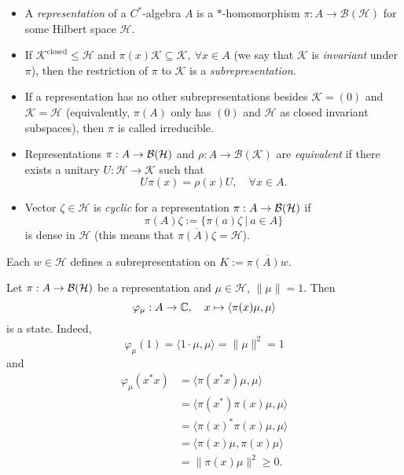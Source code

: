 \begin{definition}
  \begin{itemize}
    \item A \emph{representation} of a $C^*$-algebra $A$ is a $*$-homomorphism $\pi: A \to \mathcal{B}(\mathcal{H})$
  for some Hilbert space $\mathcal{H}$. 
    \item If $\mathcal{K}^{\mathrm{closed}} \leq \mathcal{H}$ and $\pi(x) \mathcal{K} \subseteq \mathcal{K},\ \forall x \in A$ (we say that $\mathcal{K}$ is \emph{invariant} under $\pi$),
  then the restriction of $\pi$ to $\mathcal{K}$ is a \emph{subrepresentation}.
    \item   If a representation has no other subrepresentations besides $\mathcal{K} = (0)$ and $\mathcal{K} = \mathcal{H}$
  (equivalently, $\pi(A)$ only has $(0)$ and $\mathcal{H}$ as closed invariant subspaces),
  then $\pi$ is called irreducible.
    \item Representations $\pi: A \to \operatorname{\mathcal{B} (\mathcal{H})}$ and $\rho: A \to \mathcal{B} (\mathcal{K})$
  are \emph{equivalent} if there exists a unitary $U: \mathcal{H} \to \mathcal{K}$ such that $$U \pi(x) = \rho(x) U,\quad \forall x \in A.$$
    \item Vector $\zeta \in \mathcal{H}$ is \emph{cyclic} for a representation $\pi: A \to \operatorname{\mathcal{B} (\mathcal{H})}$ if 
    $$\pi (A) \zeta := \{\pi(a) \zeta\ |\ a \in A\}$$
    is dense in $\mathcal{H}$ (this means that $\overline{\pi (A) \zeta} = \mathcal{H}$).
  \end{itemize}
   
\end{definition}

\begin{example}
  Each $w \in \mathcal{H}$ defines a subrepresentation on $K := \overline{\pi (A) w}$.
\end{example}

\begin{example}
  Let $\pi: A \to \operatorname{\mathcal{B} (\mathcal{H})}$ be a representation and $\mu \in \mathcal{H}$, $\| \mu \| = 1$.
  Then $$\varphi_\mu : A \to \mathbb {C},\quad x \mapsto \langle \pi (x) \mu, \mu \rangle$$
  is a state. Indeed, 
  $$\varphi_\mu (1) = \langle 1 \cdot \mu, \mu \rangle = \| \mu \|^2 = 1$$
  and 
  \begin{align*}
    \varphi_\mu (x^* x) &= \langle \pi(x^* x) \mu, \mu \rangle\\
    &= \langle \pi (x^*) \pi (x) \mu, \mu \rangle\\
    &= \langle \pi (x)^* \pi (x) \mu, \mu\rangle \\
    &= \langle \pi (x) \mu, \pi(x) \mu \rangle\\
    &= \| \pi(x) \mu \|^2 \geq 0.
  \end{align*}
\end{example}

